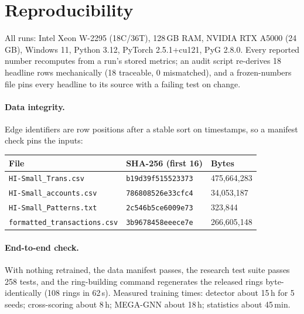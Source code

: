 \section{Reproducibility}
\label{app:repro}

All runs: Intel Xeon W-2295 (18C/36T), 128\,GB RAM, NVIDIA RTX A5000 (24\,GB), Windows 11,
Python 3.12, PyTorch 2.5.1+cu121, PyG 2.8.0.
Every reported number recomputes from a run's stored metrics; an audit script re-derives 18
headline rows mechanically (18 traceable, 0 mismatched), and a frozen-numbers file pins every
headline to its source with a failing test on change.

\paragraph{Data integrity.}
Edge identifiers are row positions after a stable sort on timestamps, so a manifest check pins
the inputs:

\begin{center}\small
\begin{tabular}{lll}
\toprule
File & SHA-256 (first 16) & Bytes \\
\midrule
\texttt{HI-Small\_Trans.csv} & \texttt{b19d39f515523373} & 475{,}664{,}283 \\ %
\texttt{HI-Small\_accounts.csv} & \texttt{786808526e33cfc4} & 34{,}053{,}187 \\ %
\texttt{HI-Small\_Patterns.txt} & \texttt{2c546b5ce6009e73} & 323{,}844 \\ %
\texttt{formatted\_transactions.csv} & \texttt{3b9678458eeece7e} & 266{,}605{,}148 \\ %
\bottomrule
\end{tabular}
\end{center}

\paragraph{End-to-end check.}
With nothing retrained, the data manifest passes, the research test suite passes 258 tests,
and the ring-building command regenerates the released rings byte-identically (108 rings in
62\,s).
Measured training times: detector about 15\,h for 5 seeds; cross-scoring about 8\,h; MEGA-GNN
about 18\,h; statistics about 45\,min.

